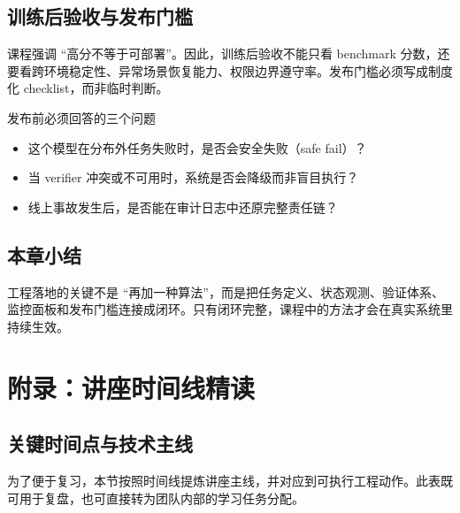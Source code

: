 \documentclass[a4paper]{article}
\begin{document}
\subsection{训练后验收与发布门槛}
课程强调 ``高分不等于可部署''。因此，训练后验收不能只看 benchmark 分数，还要看跨环境稳定性、异常场景恢复能力、权限边界遵守率。发布门槛必须写成制度化 checklist，而非临时判断。

\begin{warningbox}{发布前必须回答的三个问题}
\begin{itemize}
    \item 这个模型在分布外任务失败时，是否会安全失败（safe fail）？
    \item 当 verifier 冲突或不可用时，系统是否会降级而非盲目执行？
    \item 线上事故发生后，是否能在审计日志中还原完整责任链？
\end{itemize}
\end{warningbox}

\subsection{本章小结}
工程落地的关键不是 ``再加一种算法''，而是把任务定义、状态观测、验证体系、监控面板和发布门槛连接成闭环。只有闭环完整，课程中的方法才会在真实系统里持续生效。

\section{附录：讲座时间线精读}

\subsection{关键时间点与技术主线}
为了便于复习，本节按照时间线提炼讲座主线，并对应到可执行工程动作。此表既可用于复盘，也可直接转为团队内部的学习任务分配。
\end{document}
